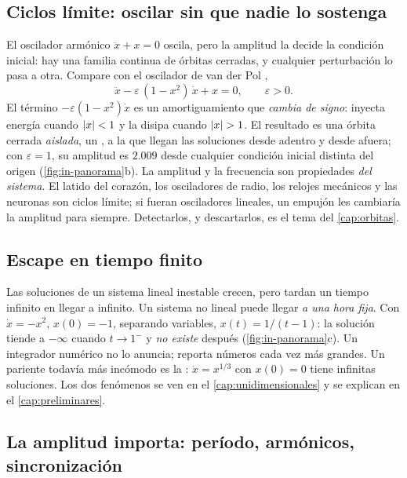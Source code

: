 \subsection{Ciclos límite: oscilar sin que nadie lo sostenga}

El oscilador armónico $\ddot x+x=0$ oscila, pero la amplitud la decide la condición inicial: hay una familia continua de órbitas cerradas, y cualquier perturbación lo pasa a otra. Compare con el oscilador de van der Pol \citep{van26},
\begin{equation}
  \ddot x-\varepsilon\,(1-x^2)\,\dot x+x=0,\qquad\varepsilon>0 .
  \label{eq:in-vdp}
\end{equation}
El término $-\varepsilon(1-x^2)\dot x$ es un amortiguamiento que \emph{cambia de signo}: inyecta energía cuando $\left\lvert x\right\rvert<1$ y la disipa cuando $\left\lvert x\right\rvert>1$. El resultado es una órbita cerrada \emph{aislada}, un , a la que llegan las soluciones desde adentro y desde afuera; con $\varepsilon=1$, su amplitud es $2.009$ desde cualquier condición inicial distinta del origen (\cref{fig:in-panorama}b). La amplitud y la frecuencia son propiedades \emph{del sistema}. El latido del corazón, los osciladores de radio, los relojes mecánicos y las neuronas son ciclos límite; si fueran osciladores lineales, un empujón les cambiaría la amplitud para siempre. Detectarlos, y descartarlos, es el tema del \cref{cap:orbitas}.


\subsection{Escape en tiempo finito}

Las soluciones de un sistema lineal inestable crecen, pero tardan un tiempo infinito en llegar a infinito. Un sistema no lineal puede llegar \emph{a una hora fija}. Con $\dot x=-x^2$, $x(0)=-1$, separando variables, $x(t)=1/(t-1)$: la solución tiende a $-\infty$ cuando $t\to1^-$ y \emph{no existe} después (\cref{fig:in-panorama}c). Un integrador numérico no lo anuncia; reporta números cada vez más grandes. Un pariente todavía más incómodo es la : $\dot x=x^{1/3}$ con $x(0)=0$ tiene infinitas soluciones. Los dos fenómenos se ven en el \cref{cap:unidimensionales} y se explican en el \cref{cap:preliminares}.

\subsection{La amplitud importa: período, armónicos, sincronización}

